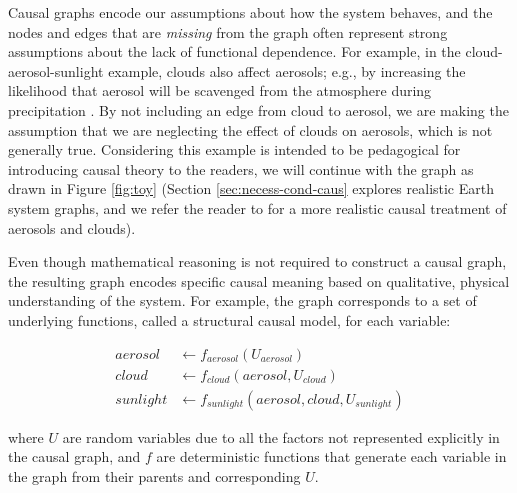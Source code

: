 \documentclass[12pt]{article}
\begin{document}
Causal graphs encode our assumptions about how the system behaves, and
the nodes and edges that are \textit{missing} from the graph often
represent strong assumptions about the lack of functional
dependence. For example, in the cloud-aerosol-sunlight example, clouds
also affect aerosols; e.g., by increasing the likelihood that aerosol
will be scavenged from the atmosphere during precipitation
\citep[e.g.,][]{radke-scavenge-1980, jurado2008,
  blanco-alegre2018}. By not including an edge from cloud to aerosol,
we are making the assumption that we are neglecting the effect of
clouds on aerosols, which is not generally true. Considering this
example is intended to be pedagogical for introducing causal theory to
the readers, we will continue with the graph as drawn in Figure
\ref{fig:toy} (Section \ref{sec:necess-cond-caus} explores realistic
Earth system graphs, and we refer the reader to \cite{gryspeerdt-2019}
for a more realistic causal treatment of aerosols and clouds).


Even though mathematical reasoning is not required to construct a
causal graph, the resulting graph encodes specific causal meaning
based on qualitative, physical understanding of the system. For
example, the graph corresponds to a set of underlying functions,
called a structural causal model, for each variable:

\begin{align}
  \label{eq:2}
  aerosol &\leftarrow f_{aerosol} (U_{aerosol}) \\
  cloud &\leftarrow f_{cloud} (aerosol, U_{cloud})\\
  sunlight &\leftarrow f_{sunlight} (aerosol, cloud, U_{sunlight})
\end{align}

where $U$ are random variables due to all the factors not represented
explicitly in the causal graph, and $f$ are deterministic functions
that generate each variable in the graph from their parents and
corresponding $U$.
\end{document}
